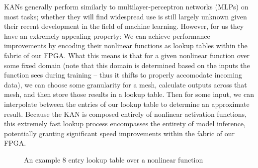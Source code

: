 \documentclass{article}
\begin{document}
KANs generally perform similarly to multilayer-perceptron networks (MLPs) on most tasks; whether they will find widespread use is still largely unknown given their recent development in the field of machine learning. However, for us they have an extremely appealing property: We can achieve performance improvements by encoding their nonlinear functions as lookup tables within the fabric of our FPGA. What this means is that for a given nonlinear function over some fixed domain (note that this domain is determined based on the inputs the function sees during training -- thus it shifts to properly accomodate incoming data), we can choose some granularity for a mesh, calculate outputs across that mesh, and then store those results in a lookup table. Then for some input, we can interpolate between the entries of our lookup table to determine an approximate result. Because the KAN is composed entirely of nonlinear activation functions, this extremely fast lookup process encompasses the entirety of model inference, potentially granting significant speed improvements within the fabric of our FPGA.

\begin{figure}[H]
{}
\caption{An example 8 entry lookup table over a nonlinear function}
\label{fig:lkup-diagram}
\end{figure}
\end{document}
